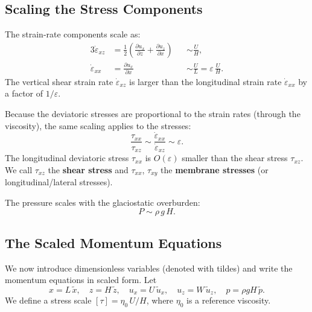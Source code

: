 \documentclass[11pt]{article}
\begin{document}
\subsection{Scaling the Stress Components}
\label{sec:stress_scaling}

The strain-rate components scale as:
\begin{alignat}{3}
  \dot{\varepsilon}_{xz} &= \frac{1}{2}\left(\frac{\partial u_x}{\partial z} + \frac{\partial u_z}{\partial x}\right) &&\sim \frac{U}{H}, \label{eq:scale_exz} \\[6pt]
  \dot{\varepsilon}_{xx} &= \frac{\partial u_x}{\partial x} &&\sim \frac{U}{L} = \varepsilon\,\frac{U}{H}. \label{eq:scale_exx}
\end{alignat}
The vertical shear strain rate $\dot{\varepsilon}_{xz}$ is larger than the longitudinal strain rate $\dot{\varepsilon}_{xx}$ by a factor of $1/\varepsilon$.

\medskip
\noindent Because the deviatoric stresses are proportional to the strain rates (through the viscosity), the same scaling applies to the stresses:
\begin{equation}
  \frac{\tau_{xx}}{\tau_{xz}} \sim \frac{\dot{\varepsilon}_{xx}}{\dot{\varepsilon}_{xz}} \sim \varepsilon.
  \label{eq:stress_ratio}
\end{equation}
The longitudinal deviatoric stress $\tau_{xx}$ is $O(\varepsilon)$ smaller than the shear stress $\tau_{xz}$.  We call $\tau_{xz}$ the \textbf{shear stress} and $\tau_{xx}$, $\tau_{xy}$ the \textbf{membrane stresses} (or longitudinal/lateral stresses).

\medskip
\noindent The pressure scales with the glaciostatic overburden:
\begin{equation}
  P \sim \rho\,g\,H.
\end{equation}

\subsection{The Scaled Momentum Equations}
\label{sec:scaled_momentum}

We now introduce dimensionless variables (denoted with tildes) and write the momentum equations in scaled form.  Let
\begin{equation}
  x = L\,\tilde{x}, \quad z = H\,\tilde{z}, \quad u_x = U\,\tilde{u}_x, \quad u_z = W\,\tilde{u}_z, \quad p = \rho g H\,\tilde{p}.
\end{equation}
We define a stress scale $[\tau] = \eta_0\,U/H$, where $\eta_0$ is a reference viscosity.
\end{document}
